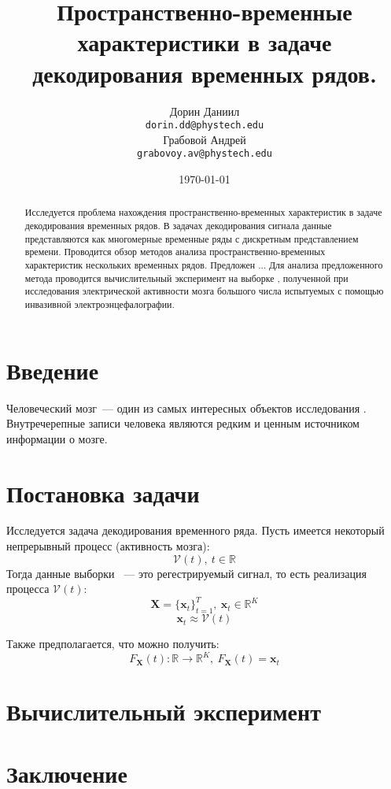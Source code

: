 \documentclass[a4paper, 12pt]{extarticle}
\title{Пространственно-временные характеристики в задаче декодирования временных рядов.}
\author{
	Дорин Даниил \\
	\texttt{dorin.dd@phystech.edu} \\
	\And
	Грабовой Андрей \\
	\texttt{grabovoy.av@phystech.edu}
}
\date{\today}
\begin{document}
\maketitle

\begin{abstract}

	Исследуется проблема нахождения пространственно-временных характеристик в задаче декодирования временных рядов. В задачах декодирования сигнала данные представляются как многомерные временные ряды с дискретным представлением времени. 
	Проводится обзор методов анализа пространственно-временных характеристик нескольких временных рядов.
    Предложен ...
	Для анализа предложенного метода проводится вычислительный эксперимент на
	выборке \citep{Berezutskaya2022}, полученной при исследования электрической активности мозга большого числа испытуемых с помощью инвазивной электроэнцефалографии.

\end{abstract}



\section{Введение}
Человеческий мозг~--- один из самых интересных объектов исследования \citep{Zhumakova}. 
Внутречерепные записи человека являются редким и ценным источником информации о мозге.

\section{Постановка задачи}
Исследуется задача декодирования временного ряда. Пусть имеется некоторый непрерывный процесс (активность мозга):
$$\mathcal{V}(t),~t \in \mathbb{R}$$
Тогда данные выборки ~--- это регестрируемый сигнал, то есть реализация процесса $\mathcal{V}(t)$:
$$\bm{X} = \{\bm{x}_t\}_{t=1}^T,~\bm{x}_t \in \mathbb{R}^K$$
$$\bm{x}_t \approx \mathcal{V}(t)$$

Также предполагается, что можно получить:
$$F_{\bm{X}}(t): \mathbb{R} \rightarrow \mathbb{R}^K,~ F_{\bm{X}}(t) = \bm{x}_t$$


\section{Вычислительный эксперимент}





\section{Заключение}


\newpage



\end{document}
